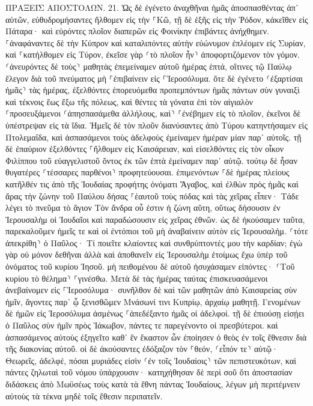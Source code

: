 \documentclass[twoside, 9pt]{extreport}
\begin{document}
ΠΡΑΞΕΙΣ ΑΠΟΣΤΟΛΩΝ.
21.
Ὡς δὲ ἐγένετο ἀναχθῆναι ἡμᾶς ἀποσπασθέντας ἀπ᾽ αὐτῶν, εὐθυδρομήσαντες ἤλθομεν εἰς τὴν ⸀Κῶ, τῇ δὲ ἑξῆς εἰς τὴν Ῥόδον, κἀκεῖθεν εἰς Πάταρα· 
καὶ εὑρόντες πλοῖον διαπερῶν εἰς Φοινίκην ἐπιβάντες ἀνήχθημεν. 
⸀ἀναφάναντες δὲ τὴν Κύπρον καὶ καταλιπόντες αὐτὴν εὐώνυμον ἐπλέομεν εἰς Συρίαν, καὶ ⸀κατήλθομεν εἰς Τύρον, ἐκεῖσε γὰρ ⸂τὸ πλοῖον ἦν⸃ ἀποφορτιζόμενον τὸν γόμον. 
⸂ἀνευρόντες δὲ τοὺς⸃ μαθητὰς ἐπεμείναμεν αὐτοῦ ἡμέρας ἑπτά, οἵτινες τῷ Παύλῳ ἔλεγον διὰ τοῦ πνεύματος μὴ ⸀ἐπιβαίνειν εἰς ⸀Ἱεροσόλυμα. 
ὅτε δὲ ἐγένετο ⸂ἐξαρτίσαι ἡμᾶς⸃ τὰς ἡμέρας, ἐξελθόντες ἐπορευόμεθα προπεμπόντων ἡμᾶς πάντων σὺν γυναιξὶ καὶ τέκνοις ἕως ἔξω τῆς πόλεως, καὶ θέντες τὰ γόνατα ἐπὶ τὸν αἰγιαλὸν ⸀προσευξάμενοι 
⸂ἀπησπασάμεθα ἀλλήλους, καὶ⸃ ⸀ἐνέβημεν εἰς τὸ πλοῖον, ἐκεῖνοι δὲ ὑπέστρεψαν εἰς τὰ ἴδια. 
Ἡμεῖς δὲ τὸν πλοῦν διανύσαντες ἀπὸ Τύρου κατηντήσαμεν εἰς Πτολεμαΐδα, καὶ ἀσπασάμενοι τοὺς ἀδελφοὺς ἐμείναμεν ἡμέραν μίαν παρ᾽ αὐτοῖς. 
τῇ δὲ ἐπαύριον ἐξελθόντες ⸀ἤλθομεν εἰς Καισάρειαν, καὶ εἰσελθόντες εἰς τὸν οἶκον Φιλίππου τοῦ εὐαγγελιστοῦ ὄντος ἐκ τῶν ἑπτὰ ἐμείναμεν παρ᾽ αὐτῷ. 
τούτῳ δὲ ἦσαν θυγατέρες ⸂τέσσαρες παρθένοι⸃ προφητεύουσαι. 
ἐπιμενόντων ⸀δὲ ἡμέρας πλείους κατῆλθέν τις ἀπὸ τῆς Ἰουδαίας προφήτης ὀνόματι Ἅγαβος, 
καὶ ἐλθὼν πρὸς ἡμᾶς καὶ ἄρας τὴν ζώνην τοῦ Παύλου δήσας ⸀ἑαυτοῦ τοὺς πόδας καὶ τὰς χεῖρας εἶπεν· Τάδε λέγει τὸ πνεῦμα τὸ ἅγιον Τὸν ἄνδρα οὗ ἐστιν ἡ ζώνη αὕτη, οὕτως δήσουσιν ἐν Ἰερουσαλὴμ οἱ Ἰουδαῖοι καὶ παραδώσουσιν εἰς χεῖρας ἐθνῶν. 
ὡς δὲ ἠκούσαμεν ταῦτα, παρεκαλοῦμεν ἡμεῖς τε καὶ οἱ ἐντόπιοι τοῦ μὴ ἀναβαίνειν αὐτὸν εἰς Ἰερουσαλήμ. 
⸂τότε ἀπεκρίθη⸃ ὁ Παῦλος· Τί ποιεῖτε κλαίοντες καὶ συνθρύπτοντές μου τὴν καρδίαν; ἐγὼ γὰρ οὐ μόνον δεθῆναι ἀλλὰ καὶ ἀποθανεῖν εἰς Ἰερουσαλὴμ ἑτοίμως ἔχω ὑπὲρ τοῦ ὀνόματος τοῦ κυρίου Ἰησοῦ. 
μὴ πειθομένου δὲ αὐτοῦ ἡσυχάσαμεν εἰπόντες· ⸂Τοῦ κυρίου τὸ θέλημα⸃ ⸀γινέσθω. 
Μετὰ δὲ τὰς ἡμέρας ταύτας ἐπισκευασάμενοι ἀνεβαίνομεν εἰς ⸀Ἱεροσόλυμα· 
συνῆλθον δὲ καὶ τῶν μαθητῶν ἀπὸ Καισαρείας σὺν ἡμῖν, ἄγοντες παρ᾽ ᾧ ξενισθῶμεν Μνάσωνί τινι Κυπρίῳ, ἀρχαίῳ μαθητῇ. 
Γενομένων δὲ ἡμῶν εἰς Ἱεροσόλυμα ἀσμένως ⸀ἀπεδέξαντο ἡμᾶς οἱ ἀδελφοί. 
τῇ δὲ ἐπιούσῃ εἰσῄει ὁ Παῦλος σὺν ἡμῖν πρὸς Ἰάκωβον, πάντες τε παρεγένοντο οἱ πρεσβύτεροι. 
καὶ ἀσπασάμενος αὐτοὺς ἐξηγεῖτο καθ᾽ ἓν ἕκαστον ὧν ἐποίησεν ὁ θεὸς ἐν τοῖς ἔθνεσιν διὰ τῆς διακονίας αὐτοῦ. 
οἱ δὲ ἀκούσαντες ἐδόξαζον τὸν ⸀θεόν, ⸂εἶπόν τε⸃ αὐτῷ· Θεωρεῖς, ἀδελφέ, πόσαι μυριάδες εἰσὶν ⸂ἐν τοῖς Ἰουδαίοις⸃ τῶν πεπιστευκότων, καὶ πάντες ζηλωταὶ τοῦ νόμου ὑπάρχουσιν· 
κατηχήθησαν δὲ περὶ σοῦ ὅτι ἀποστασίαν διδάσκεις ἀπὸ Μωϋσέως τοὺς κατὰ τὰ ἔθνη πάντας Ἰουδαίους, λέγων μὴ περιτέμνειν αὐτοὺς τὰ τέκνα μηδὲ τοῖς ἔθεσιν περιπατεῖν. 
\end{document}
